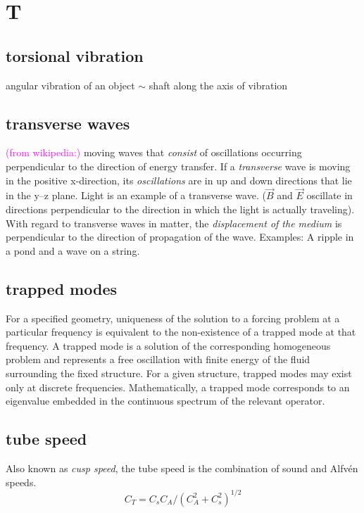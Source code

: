 \documentclass[12pt]{article}
\begin{document}
\section*{T}

\subsection*{torsional vibration}
\begin{itemize*}
    \item angular vibration of an object $\sim$ shaft along the
        axis of vibration
\end{itemize*}

\subsection*{transverse waves}
\textcolor{magenta}{(from wikipedia:)}
moving waves that \emph{consist} of oscillations occurring perpendicular
to the direction of energy transfer.
If a \emph{transverse} wave is moving in the positive x-direction,
its \emph{oscillations} are in up and down directions that lie in the y–z plane.
Light is an example of a transverse wave.
($\vec B$ and $\vec E$ oscillate in directions perpendicular to the direction
in which the light is actually traveling).
With regard to transverse waves in matter,
the \emph{displacement of the medium} is perpendicular to the
direction of propagation of the wave.
Examples: A ripple in a pond and a wave on a string.

\subsection*{trapped modes}
For a specified geometry, uniqueness of the solution to a forcing problem
at a particular frequency is equivalent to the non-existence of a trapped
mode at that frequency. A trapped mode is a solution of the corresponding
homogeneous problem and represents a free oscillation with finite energy
of the fluid surrounding the fixed structure. For a given structure,
trapped modes may exist only at discrete frequencies.
Mathematically, a trapped mode corresponds to an eigenvalue embedded
in the continuous spectrum of the relevant operator.

\subsection*{tube speed}
Also known as \emph{cusp speed}, the tube speed is the combination of sound
and Alfv\'en speeds.
$$ C_T = C_sC_A/(C_A^2 + C_s^2)^{1/2} $$
\end{document}
